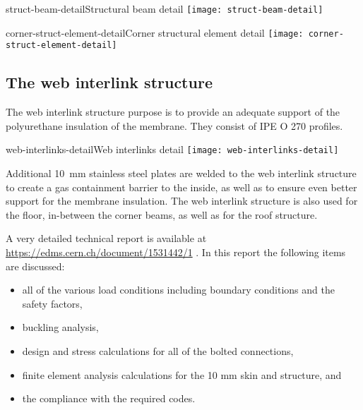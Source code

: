 \begin{cdrfigure}{struct-beam-detail}{Structural beam detail}
  \texttt{[image: struct-beam-detail]}
\end{cdrfigure}

\begin{cdrfigure}{corner-struct-element-detail}{Corner structural element detail}
  \texttt{[image: corner-struct-element-detail]}
\end{cdrfigure}


\subsection{The web interlink structure}

The web interlink structure purpose is to provide an adequate support of the polyurethane insulation of the membrane. They consist of IPE O 270 profiles. 

\begin{cdrfigure}{web-interlinks-detail}{Web interlinks detail}
  \texttt{[image: web-interlinks-detail]}
\end{cdrfigure}


Additional \SI{10}{mm} stainless steel plates are welded to the web interlink structure to create a gas containment barrier to the inside, as well as to ensure even better support for the membrane insulation. 
The web interlink structure is also used for the floor, in-between the corner beams, as well as for the roof structure.

A very detailed technical report is available at \url{https://edms.cern.ch/document/1531442/1} .
In this report the following items are discussed:
\begin{itemize}
\item all of the various load conditions including boundary conditions and the safety factors,
\item buckling analysis,
\item design and stress calculations for all of the bolted connections,
\item finite element analysis calculations for the 10 mm skin and structure, and
\item the compliance with the required codes.
\end{itemize}

